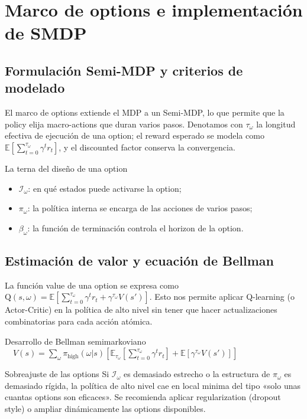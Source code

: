 \section{Marco de options e implementación de SMDP}

\subsection{Formulación Semi-MDP y criterios de modelado}

El marco de options extiende el MDP a un Semi-MDP, lo que permite que la policy elija macro-actions que duran varios pasos. Denotamos con $\tau_\omega$ la longitud efectiva de ejecución de una option; el reward esperado se modela como $\mathbb{E}\left[\sum_{t=0}^{\tau_\omega} \gamma^t r_t\right]$, y el discounted factor conserva la convergencia.

\begin{importantbox}{La terna del diseño de una option}
\begin{itemize}
    \item $\mathcal{I}_\omega$: en qué estados puede activarse la option;
    \item $\pi_\omega$: la política interna se encarga de las acciones de varios pasos;
    \item $\beta_\omega$: la función de terminación controla el horizon de la option.
\end{itemize}
\end{importantbox}

\subsection{Estimación de valor y ecuación de Bellman}

La función value de una option se expresa como \(\mathrm{Q}(s, \omega) = \mathbb{E}\left[\sum_{t=0}^{\tau_\omega} \gamma^t r_t + \gamma^{\tau_\omega} V(s')\right]\). Esto nos permite aplicar Q-learning (o Actor-Critic) en la política de alto nivel sin tener que hacer actualizaciones combinatorias para cada acción atómica.

\begin{knowledgebox}{Desarrollo de Bellman semimarkoviano}
\(\quad V(s)=\sum_\omega \pi_{\text{high}}(\omega|s)\left[\mathbb{E}_{\tau_\omega}\left[\sum_{t=0}^{\tau_\omega}\gamma^t r_t\right]+\mathbb{E}[\gamma^{\tau_\omega}V(s')]\right]\)
\end{knowledgebox}

\begin{warningbox}{Sobreajuste de las options}
Si $\mathcal{I}_\omega$ es demasiado estrecho o la estructura de $\pi_\omega$ es demasiado rígida, la política de alto nivel cae en local minima del tipo «solo unas cuantas options son eficaces». Se recomienda aplicar regularization (dropout style) o ampliar dinámicamente las options disponibles.
\end{warningbox}

